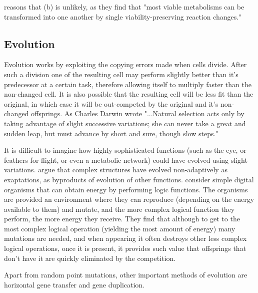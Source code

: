 \documentclass[10pt,a4paper]{article}
\begin{document}
	 \citeauthor{historical} reasons that (b) is unlikely, as they find that  "most viable metabolisms can be transformed into one another by single viability-preserving reaction changes."  
	
	\subsection{Evolution}\label{chap:evolution}
	
	Evolution works by exploiting the copying errors made when cells divide. After such a division one of the resulting cell may perform slightly better than it's predecessor at a certain task, therefore allowing itself to multiply faster than the non-changed cell. It is also possible that the resulting cell will be less fit than the original, in which case it will be out-competed by the original and it's non-changed offsprings. As Charles Darwin wrote "...Natural selection acts only by taking advantage of slight successive variations; she can never take a great and sudden leap, but must advance by short and sure, though slow steps." \cite{darwin} 
	
	It is difficult to imagine how highly sophisticated functions (such as the eye, or feathers for flight, or even a metabolic network) could have evolved using slight variations. \citeauthor{latent} argue that complex structures have evolved non-adaptively as exaptations, as byproducts of evolution of other functions. \citeauthor{complexfeatures}  consider simple digital organisms that can obtain energy by performing logic functions. The organisms are provided an environment where they can reproduce (depending on the energy available to them) and mutate, and the more complex logical function they perform, the more energy they receive. They find that although to get to the most complex logical operation (yielding the most amount of energy) many mutations are needed, and when appearing it often destroys other less complex logical operations, once it is present, it provides such value that offsprings that don't have it are quickly eliminated by the competition.
	
	Apart from random point mutations, other important methods of evolution are horizontal gene transfer and gene duplication. 
	
\end{document}
